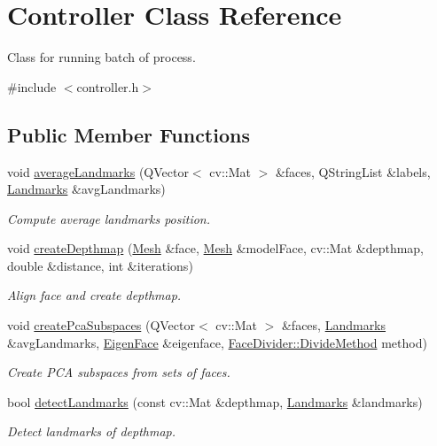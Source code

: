 \hypertarget{class_controller}{\section{Controller Class Reference}
\label{class_controller}
}


Class for running batch of process.  




{\ttfamily \#include $<$controller.\+h$>$}

\subsection*{Public Member Functions}
\begin{DoxyCompactItemize}
\item 
void \hyperlink{class_controller_aa4582c4f3bdab75cdb2f9eacefba5e02}{average\+Landmarks} (Q\+Vector$<$ cv\+::\+Mat $>$ \&faces, Q\+String\+List \&labels, \hyperlink{class_landmarks}{Landmarks} \&avg\+Landmarks)
\begin{DoxyCompactList}\small\item\em Compute average landmarks position. \end{DoxyCompactList}\item 
void \hyperlink{class_controller_a8146448bc74ad8c910ad445e7756e881}{create\+Depthmap} (\hyperlink{class_mesh}{Mesh} \&face, \hyperlink{class_mesh}{Mesh} \&model\+Face, cv\+::\+Mat \&depthmap, double \&distance, int \&iterations)
\begin{DoxyCompactList}\small\item\em Align face and create depthmap. \end{DoxyCompactList}\item 
void \hyperlink{class_controller_a7d88f572ad677e2d4a70a5c928c0c323}{create\+Pca\+Subspaces} (Q\+Vector$<$ cv\+::\+Mat $>$ \&faces, \hyperlink{class_landmarks}{Landmarks} \&avg\+Landmarks, \hyperlink{class_eigen_face}{Eigen\+Face} \&eigenface, \hyperlink{class_face_divider_afd66ad7d2423aaa67e20a7f6cbabb6ef}{Face\+Divider\+::\+Divide\+Method} method)
\begin{DoxyCompactList}\small\item\em Create P\+C\+A subspaces from sets of faces. \end{DoxyCompactList}\item 
bool \hyperlink{class_controller_af285e4f21427f26328d52737b5d12c01}{detect\+Landmarks} (const cv\+::\+Mat \&depthmap, \hyperlink{class_landmarks}{Landmarks} \&landmarks)
\begin{DoxyCompactList}\small\item\em Detect landmarks of depthmap. \end{DoxyCompactList}\item 

\end{DoxyCompactItemize}
